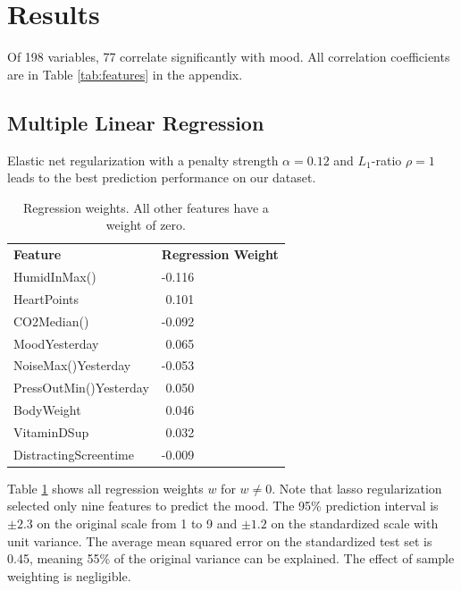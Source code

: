 \documentclass[conference]{IEEEtran}
\begin{document}




\section{Results}
Of 198 variables, 77 correlate significantly with mood. All correlation coefficients are in Table \ref{tab:features} in the appendix. 


\subsection{Multiple Linear Regression}
Elastic net regularization with a penalty strength $\alpha=0.12$ and $L_1$-ratio $\rho=1$ leads to the best prediction performance on our dataset.

\begin{table}[]
\caption[]{Regression weights. All other features have a weight of zero.}
\begin{tabular}{ll}
\textbf{Feature}       & \textbf{Regression Weight} \\
HumidInMax()           & -0.116                     \\
HeartPoints            & \,\,0.101                      \\
CO2Median()            & -0.092                     \\
MoodYesterday          & \,\,0.065                      \\
NoiseMax()Yesterday    & -0.053                     \\
PressOutMin()Yesterday & \,\,0.050                      \\
BodyWeight             & \,\,0.046                      \\
VitaminDSup            & \,\,0.032                      \\
DistractingScreentime  & -0.009                    
\end{tabular}
\label{tab:reg}
\end{table}

Table \ref{tab:reg} shows all regression weights $w$ for $w\neq0$. Note that lasso regularization selected only nine features to predict the mood. 
The 95\% prediction interval is $\pm2.3$ on the original scale from 1 to 9 and $\pm1.2$ on the standardized scale with unit variance.
The average mean squared error on the standardized test set is 0.45, meaning 55\% of the original variance can be explained.
The effect of sample weighting is negligible.
\end{document}
